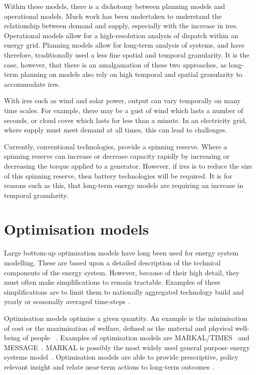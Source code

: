 Within these models, there is a dichotomy between planning models and operational models. Much work has been undertaken to understand the relationship between demand and supply, especially with the increase in \acrshort{ires}. Operational models allow for a high-resolution analysis of dispatch within an energy grid. Planning models allow for long-term analysis of systems, and have therefore, traditionally used a less fine spatial and temporal granularity. It is the case, however, that there is an amalgamation of these two approaches, as long-term planning on models also rely on high temporal and spatial granularity to accommodate \acrshort{ires}.

With \acrshort{ires} such as wind and solar power, output can vary temporally on many time scales. For example, there may be a gust of wind which lasts a number of seconds, or cloud cover which lasts for less than a minute. In an electricity grid, where supply must meet demand at all times, this can lead to challenges.

Currently, conventional technologies, provide a spinning reserve. Where a spinning reserve can increase or decrease capacity rapidly by increasing or decreasing the torque applied to a generator. However, if \acrshort{ires} is to reduce the size of this spinning reserve, then battery technologies will be required. It is for reasons such as this, that long-term energy models are requiring an increase in temporal granularity.





\section{Optimisation models}
\label{sec:litreview:optimisation}

Large bottom-up optimisation models have long been used for energy system modelling. These are based upon a detailed description of the technical components of the energy system. However, because of their high detail, they must often make simplifications to remain tractable. Examples of these simplifications are to limit them to nationally aggregated technology build and yearly or seasonally averaged time-steps \cite{Pfenninger2014}. 



Optimisation models optimise a given quantity. An example is the minimisation of cost or the maximisation of welfare, defined as the material and physical well-being of people ~\cite{Keles2017}.  Examples of optimisation models are MARKAL/TIMES~\cite{Fishbone1981} and MESSAGE~\cite{Schrattenholzer1981}. MARKAL is possibly the most widely used general purpose energy systems model~\cite{Pfenninger2014}. Optimisation models are able to provide prescriptive, policy relevant insight and relate near-term actions to long-term outcomes \cite{DeCarolis2012}.

